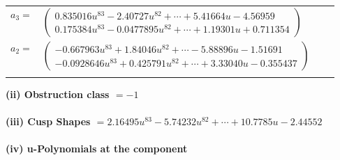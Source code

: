 \documentclass[1p]{elsarticle_modified}
\theoremstyle{definition}
\begin{document}
\begin{tabular}{m{7pt} m{180pt} m{7pt} m{180pt} }
\flushright $a_{3}=$&$\begin{pmatrix}0.835016 u^{83}-2.40727 u^{82}+\cdots+5.41664 u-4.56959\\0.175384 u^{83}-0.0477895 u^{82}+\cdots+1.19301 u+0.711354\end{pmatrix}$ \\
\flushright $a_{2}=$&$\begin{pmatrix}-0.667963 u^{83}+1.84046 u^{82}+\cdots-5.88896 u-1.51691\\-0.0928646 u^{83}+0.425791 u^{82}+\cdots+3.33040 u-0.355437\end{pmatrix}$\\&\end{tabular}
\flushleft \textbf{(ii) Obstruction class $= -1$}\\~\\
\flushleft \textbf{(iii) Cusp Shapes $= 2.16495 u^{83}-5.74232 u^{82}+\cdots+10.7785 u-2.44552$}\\~\\
\newpage\renewcommand{\arraystretch}{1}
\flushleft \textbf{(iv) u-Polynomials at the component}\newline \\
\end{document}
